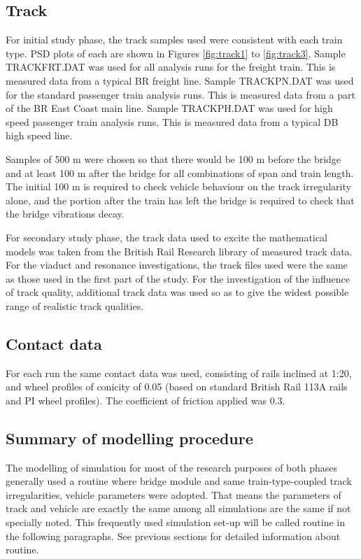 \begin{appendices}
\subsection{Track}

For initial study phase, the track samples used were consistent with each train type. PSD plots of each are shown in Figures \ref{fig:track1} to \ref{fig:track3}. Sample TRACKFRT.DAT was used for all analysis runs for the freight train. This is measured data from a typical BR freight line. Sample TRACKPN.DAT was used for the standard passenger train analysis runs. This is measured data from a part of the BR East Coast main line. Sample TRACKPH.DAT was used for high speed passenger train analysis runs. This is measured data from a typical DB high speed line.

Samples of 500 m were chosen so that there would be 100 m before the bridge and at least 100 m after the bridge for all combinations of span and train length. The initial 100 m is required to check vehicle behaviour on the track irregularity alone, and the portion after the train has left the bridge is required to check that the bridge vibrations decay.

For secondary study phase, the track data used to excite the mathematical models was taken from the British Rail Research library of measured track data. For the viaduct and resonance investigations, the track files used were the same as those used in the first part of the study. For the investigation of the influence of track quality, additional track data was used so as to give the widest possible range of realistic track qualities.

\subsection{Contact data}
For each run the same contact data was used, consisting of rails inclined at 1:20, and wheel profiles of conicity of 0.05 (based on standard British Rail 113A rails and PI wheel profiles). The coefficient of friction applied was 0.3.

\subsection{Summary of modelling procedure}
The modelling of simulation for most of the research purposes of both phases generally used a routine where bridge module and same train-type-coupled track irregularities, vehicle parameters were adopted. That means the parameters of track and vehicle are exactly the same among all simulations are the same if not specially noted. This frequently used simulation set-up will be called routine in the following paragraphs. See previous sections for detailed information about routine.



\end{appendices}
